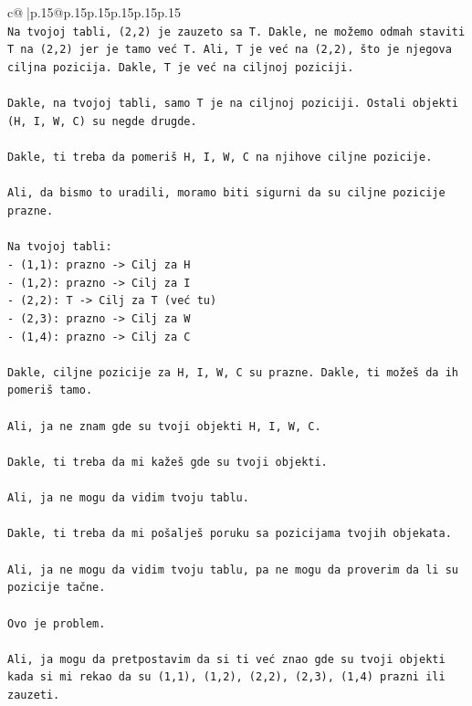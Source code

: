 \documentclass{article}
\begin{document}
{\begin{supertabular}{c@{$\;$}|p{.15\linewidth}@{}p{.15\linewidth}p{.15\linewidth}p{.15\linewidth}p{.15\linewidth}p{.15\linewidth}}
{{{\\ 
\texttt{Na tvojoj tabli, (2,2) je zauzeto sa T. Dakle, ne možemo odmah staviti T na (2,2) jer je tamo već T. Ali, T je već na (2,2), što je njegova ciljna pozicija. Dakle, T je već na ciljnoj poziciji.} \\
\\ 
\texttt{Dakle, na tvojoj tabli, samo T je na ciljnoj poziciji. Ostali objekti (H, I, W, C) su negde drugde.} \\
\\ 
\texttt{Dakle, ti treba da pomeriš H, I, W, C na njihove ciljne pozicije.} \\
\\ 
\texttt{Ali, da bismo to uradili, moramo biti sigurni da su ciljne pozicije prazne.} \\
\\ 
\texttt{Na tvojoj tabli:} \\
\texttt{{-} (1,1): prazno {-}> Cilj za H} \\
\texttt{{-} (1,2): prazno {-}> Cilj za I} \\
\texttt{{-} (2,2): T {-}> Cilj za T (već tu)} \\
\texttt{{-} (2,3): prazno {-}> Cilj za W} \\
\texttt{{-} (1,4): prazno {-}> Cilj za C} \\
\\ 
\texttt{Dakle, ciljne pozicije za H, I, W, C su prazne. Dakle, ti možeš da ih pomeriš tamo.} \\
\\ 
\texttt{Ali, ja ne znam gde su tvoji objekti H, I, W, C.} \\
\\ 
\texttt{Dakle, ti treba da mi kažeš gde su tvoji objekti.} \\
\\ 
\texttt{Ali, ja ne mogu da vidim tvoju tablu.} \\
\\ 
\texttt{Dakle, ti treba da mi pošalješ poruku sa pozicijama tvojih objekata.} \\
\\ 
\texttt{Ali, ja ne mogu da vidim tvoju tablu, pa ne mogu da proverim da li su pozicije tačne.} \\
\\ 
\texttt{Ovo je problem.} \\
\\ 
\texttt{Ali, ja mogu da pretpostavim da si ti već znao gde su tvoji objekti kada si mi rekao da su (1,1), (1,2), (2,2), (2,3), (1,4) prazni ili zauzeti.} \\
}}}
\end{supertabular}}
\end{document}
